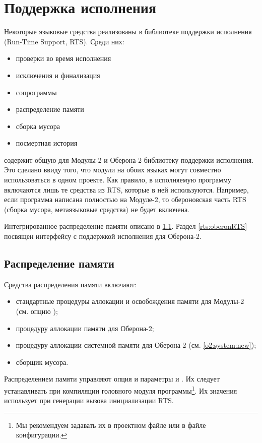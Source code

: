 \chapter{Поддержка исполнения}\label{rts}

Некоторые языковые средства реализованы в библиотеке поддержки исполнения
(Run-Time Support, RTS). Среди них:
\begin{itemize}
\ifgenc
\item   проверки во время исполнения
\fi
\item   исключения и финализация
\item   сопрограммы
\item   распределение памяти
\item   сборка мусора
\item   посмертная история
\end{itemize}
\xds{} содержит общую для Модулы-2 и Оберона-2 библиотеку поддержки
исполнения. Это сделано ввиду того, что модули на обоих языках 
могут совместно использоваться в одном проекте. Как правило, в
исполняемую программу включаются лишь те средства из RTS, которые
в ней используются. Например, если программа написана полностью на 
Модуле-2, то обероновская часть RTS (сборка мусора, метаязыковые
средства) не будет включена.

Интегрированное распределение памяти описано в
\ref{rts:mm}. Раздел \ref{rts:oberonRTS} посвящен интерфейсу
с поддержкой исполнения для Оберона-2.

\section{Распределение памяти}\label{rts:mm}

Средства распределения памяти \xds{} включают:
\begin{itemize}
\item   стандартные процедуры аллокации и освобождения памяти для
Модулы-2 (см. опцию );
\item   процедуру аллокации памяти для Оберона-2;
\item   процедуру аллокации системной памяти для Оберона-2
        (см. \ref{o2:system:new});
\item   сборщик мусора.
\end{itemize}

Распределением памяти управляют опция 
и параметры  и .
Их следует устанавливать при компиляции головного модуля программы\footnote{
Мы рекомендуем задавать их в проектном файле или в файле конфигурации.}.
Их значения \xds{} использует при генерации вызова инициализации RTS.

